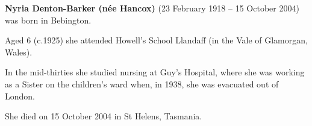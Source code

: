 


\textbf{Nyria Denton-Barker (n\'{e}e Hancox)} (23 February 1918 -- 15 October 2004) was born in Bebington.\cite{BMDIndex_JoanNyriaHancox_birth}

Aged 6 (c.1925) she attended Howell's School Llandaff (in the Vale of Glamorgan, Wales).\cite{OralHistoryJDB2008}

In the mid-thirties she studied nursing at Guy's Hospital, where she was working as a Sister on the children's ward when, in 1938, she was evacuated out of London.

She died on 15 October 2004 in St Helens, Tasmania.
